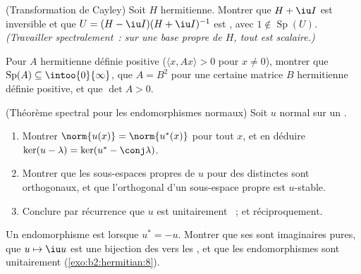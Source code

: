 \begin{exercise}[$\star\star$]\label{exo:b2:hermitian:6}
(Transformation de Cayley) Soit $H$ hermitienne. Montrer que $H + \iu
I$ est inversible et que $U = (H - \iu I)(H + \iu I)^{-1}$ est
, avec $1 \notin \operatorname{Sp}(U)$. \emph{(Travailler
spectralement~: sur une base propre de $H$, tout est scalaire.)}
\end{exercise}

\begin{exercise}[$\star\star$]\label{exo:b2:hermitian:7}
Pour $A$ hermitienne définie positive ($\langle x, Ax\rangle > 0$ pour
$x \neq 0$), montrer que $\operatorname{Sp}(A) \subseteq
\intoo{0}{\infty}$, que $A = B^2$ pour une certaine matrice $B$
hermitienne définie positive, et que $\det A > 0$.
\end{exercise}

\begin{exercise}[$\star\star\star$]\label{exo:b2:hermitian:8}
(Théorème spectral pour les endomorphismes normaux) Soit $u$ normal
sur un .
\begin{enumerate}
  \item Montrer $\norm{u(x)} = \norm{u^*(x)}$ pour tout $x$, et en
        déduire $\ker(u - \lambda) = \ker(u^* - \conj\lambda)$.
  \item Montrer que les sous-espaces propres de $u$ pour des  distinctes sont orthogonaux, et que l'orthogonal d'un
        sous-espace propre est $u$-stable.
  \item Conclure par récurrence que $u$ est unitairement
        ~; et réciproquement.
\end{enumerate}
\end{exercise}

\begin{exercise}[$\star$]\label{exo:b2:hermitian:9}
Un endomorphisme est \emph{} lorsque $u^* = -u$. Montrer
que ses  sont imaginaires pures, que $u \mapsto \iu
u$ est une bijection des  vers les
, et que les endomorphismes  sont
unitairement  (\cref{exo:b2:hermitian:8}).
\end{exercise}

